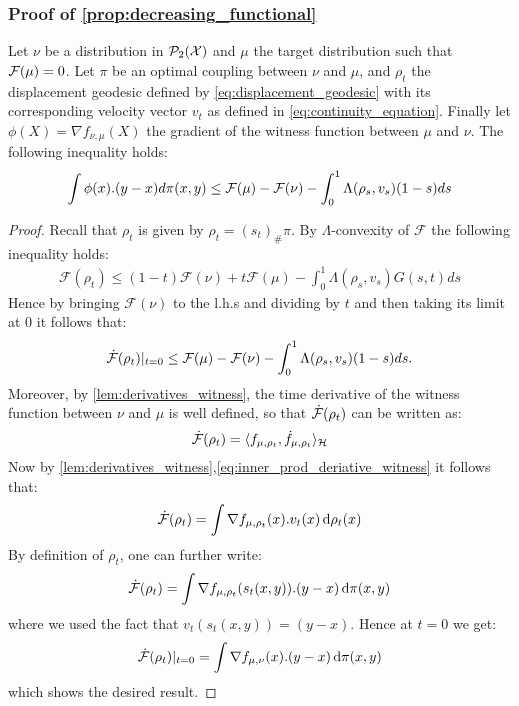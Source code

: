 \subsubsection{Proof of \cref{prop:decreasing_functional}}

\begin{lemma}	\label{lem:grad_flow_lambda_version}
Let $\nu$ be a distribution in $\mathcal{P}_2({{\mathcal X}})$ and $\mu$ the target distribution such that ${{\mathcal F}}(\mu)=0$.  Let $\pi$ be an optimal coupling between $\nu$ and $\mu$, and $\rho_t$ the displacement geodesic defined by \cref{eq:displacement_geodesic} with its corresponding velocity vector  $v_t$ as defined in \cref{eq:continuity_equation}. Finally let $\phi(X)=\nabla f_{\nu,\mu}(X)$ the gradient of the witness function between $\mu$ and $\nu$. The following inequality holds: 
\begin{align*}
	\int \phi(x).(y-x) d\pi(x,y)
	\leq
	{{\mathcal F}}(\mu)- {{\mathcal F}}(\nu) -\int_0^1 \Lambda(\rho_s,v_s)(1-s)ds
\end{align*}

\end{lemma}
\begin{proof}
Recall that $\rho_t$ is given by $\rho_t = (s_t)_{\#}\pi$. By $\Lambda$-convexity of $\mathcal{F}$ the following inequality holds:
	\begin{align*}
		\mathcal{F}(\rho_{t})\leq (1-t)\mathcal{F}(\nu)+t \mathcal{F}(\mu) - \int_0^1 \Lambda(\rho_s,v_s)G(s,t)ds
	\end{align*}
	Hence by bringing $\mathcal{F}(\nu)$ to the l.h.s and dividing by $t$ and then taking its limit at $0$ it follows that:
	\begin{align*}
	\dot{{{\mathcal F}}}(\rho_t)\vert_{t=0}\leq \mathcal	{F}(\mu)-\mathcal{F}(\nu)-\int_0^1 \Lambda(\rho_s,v_s)(1-s)ds.	
	\end{align*}
	Moreover, by \cref{lem:derivatives_witness}, the time derivative of the witness function between $\nu$ and $\mu$ is well defined, so that $\dot{{{\mathcal F}}}(\rho_t)$ can be written as:
	\[
	\dot{{{\mathcal F}}}(\rho_t) = \langle f_{\mu,\rho_t},\dot{f}_{\mu,\rho_t} \rangle_{{{\mathcal H}}}
	\]
	Now by \cref{lem:derivatives_witness},\cref{eq:inner_prod_deriative_witness} it follows that:
\[
\dot{{{\mathcal F}}}(\rho_t) = \int \nabla f_{\mu,\rho_t}(x).v_t(x)\mathop{}\!\mathrm{d} \rho_t(x)
\]
By definition of $\rho_t$,  one can further write:
\[
\dot{{{\mathcal F}}}(\rho_t) = \int \nabla f_{\mu,\rho_t}(s_t(x,y)).(y-x)\mathop{}\!\mathrm{d} \pi(x,y)
\]
where we used the fact that $v_t(s_t(x,y))=(y-x)$. Hence at $t=0$ we get:
\[
\dot{{{\mathcal F}}}(\rho_t)\vert_{t=0} = \int \nabla f_{\mu,\nu}(x).(y-x)\mathop{}\!\mathrm{d} \pi(x,y)
\]
which shows the desired result.
\end{proof}





